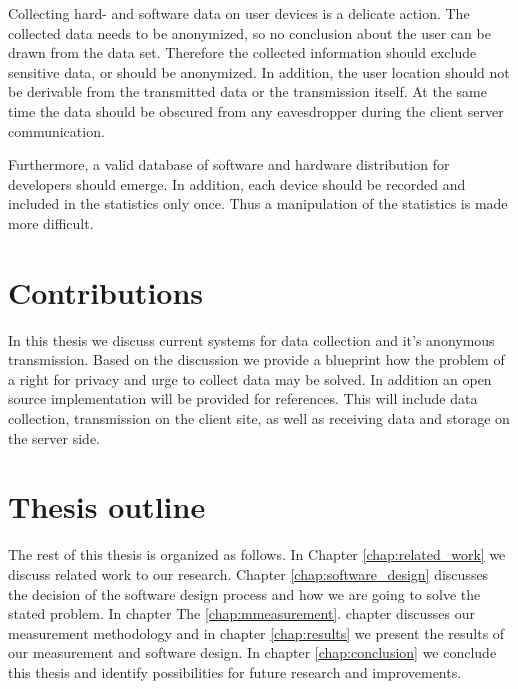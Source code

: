 Collecting hard- and software data on user devices is a delicate action. The collected data needs to be anonymized,
so no conclusion about the user can be drawn from the data set. Therefore the collected information should exclude
sensitive data, or should be anonymized. 
In addition, the user location should not be derivable from the transmitted data or the transmission itself. At the same time the data should be obscured from any eavesdropper during the client server communication.

Furthermore, a valid database of software and hardware distribution for developers should emerge. In addition,
each device should be recorded and included in the statistics only once.
Thus a manipulation of the statistics is made more difficult.



\section{Contributions}
\label{sec:intro:contrib}
%

In this thesis we discuss current systems for data collection and it's anonymous transmission. Based on the discussion we provide a blueprint how the problem of a right for privacy and urge to collect data may be solved.
In addition an open source implementation will be provided for references.
This will include data collection, transmission on the client site, as well as receiving data and storage on the server side.

\section{Thesis outline}
\label{sec:intro:outline}

The rest of this thesis is organized as follows. In Chapter \ref{chap:related_work} we discuss related work to our research. Chapter \ref{chap:software_design} discusses the decision of the software design process and how we are going to solve the stated problem.  In chapter 
The \ref{chap:mmeasurement}. chapter discusses our measurement methodology and in chapter \ref{chap:results} we present the results of our measurement and software design. In chapter \ref{chap:conclusion} we conclude this thesis and identify possibilities for future research and improvements.

